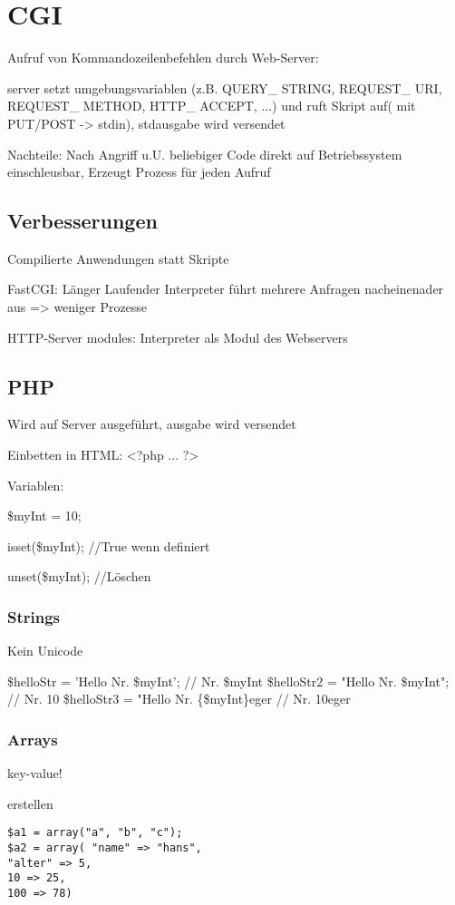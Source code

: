 \section*{CGI}
Aufruf von Kommandozeilenbefehlen durch Web-Server: 

server setzt umgebungsvariablen (z.B. QUERY\_ STRING, REQUEST\_ URI, REQUEST\_ METHOD, HTTP\_ ACCEPT, ...) und ruft Skript auf( mit PUT/POST -> stdin), stdausgabe wird versendet

Nachteile: Nach Angriff u.U. beliebiger Code direkt auf Betriebssystem einschleusbar, Erzeugt Prozess für jeden Aufruf

\subsection*{Verbesserungen}
Compilierte Anwendungen statt Skripte

FastCGI: Länger Laufender Interpreter führt mehrere Anfragen nacheinenader aus => weniger Prozesse

HTTP-Server modules: Interpreter als Modul des Webservers

\subsection*{PHP}
Wird auf Server ausgeführt, ausgabe wird versendet

Einbetten in HTML: <?php ... ?>

Variablen:

\$myInt = 10;

isset(\$myInt); //True wenn definiert

unset(\$myInt); //Löschen

\subsubsection*{Strings}
Kein Unicode

\$helloStr = 'Hello Nr. \$myInt';  // Nr. \$myInt
\$helloStr2 = "Hello Nr. \$myInt";  // Nr. 10
\$helloStr3 = "Hello Nr. \{\$myInt\}eger // Nr. 10eger 

\subsubsection*{Arrays}
key-value!

erstellen
\begin{verbatim}
$a1 = array("a", "b", "c");
$a2 = array( "name" => "hans",
"alter" => 5,
10 => 25,
100 => 78)
\end{verbatim}


